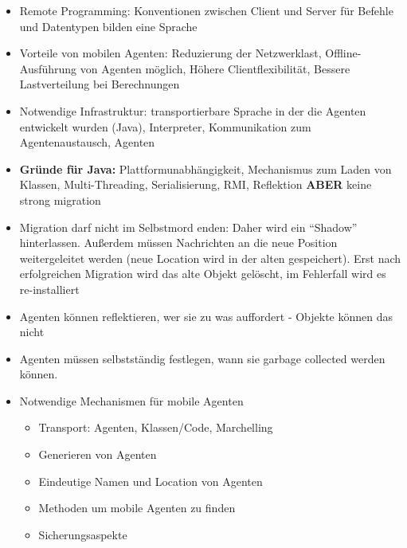 \documentclass{article} %
\begin{document}
\begin{itemize}
		\item Remote Programming: Konventionen zwischen Client und Server für Befehle und Datentypen bilden eine Sprache
		\item Vorteile von mobilen Agenten: Reduzierung der Netzwerklast, Offline-Ausführung von Agenten möglich, Höhere Clientflexibilität, Bessere Lastverteilung bei Berechnungen
		\item Notwendige Infrastruktur: transportierbare Sprache in der die Agenten entwickelt wurden (Java), Interpreter, Kommunikation zum Agentenaustausch, Agenten
		\item \textbf{Gründe für Java:} Plattformunabhängigkeit, Mechanismus zum Laden von Klassen, Multi-Threading, Serialisierung, RMI, Reflektion \textbf{ABER} keine strong migration
		\item Migration darf nicht im Selbstmord enden: Daher wird ein "`Shadow"' hinterlassen. Außerdem müssen Nachrichten an die neue Position weitergeleitet werden (neue Location wird in der alten gespeichert). Erst nach erfolgreichen Migration wird das alte Objekt gelöscht, im Fehlerfall wird es re-installiert		
		\item Agenten können reflektieren, wer sie zu was auffordert - Objekte können das nicht
		\item Agenten müssen selbstständig festlegen, wann sie garbage collected werden können.
		\item Notwendige Mechanismen für mobile Agenten
			\begin{itemize}
				\item Transport: Agenten, Klassen/Code, Marchelling
				\item Generieren von Agenten
				\item Eindeutige Namen und Location von Agenten
				\item Methoden um mobile Agenten zu finden
				\item Sicherungsaspekte
			\end{itemize}
	\end{itemize}
\end{document}

